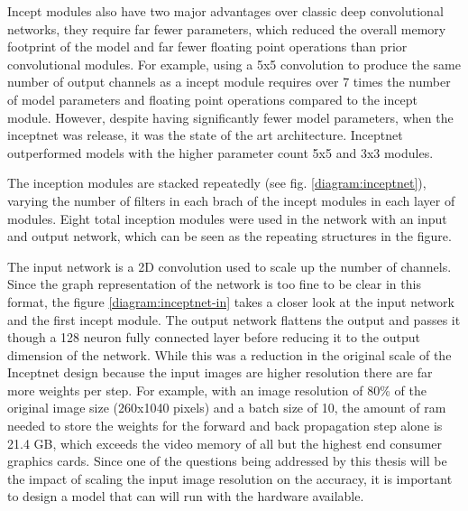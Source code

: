 Incept modules also have two major advantages over classic deep convolutional networks, they require far fewer parameters, which reduced the overall memory footprint of the model and far fewer floating point operations than prior convolutional modules. For example, using a 5x5 convolution to produce the same number of output channels as a incept module requires over 7 times the number of model parameters and floating point operations compared to the incept module. However, despite having significantly fewer model parameters, when the inceptnet was release, it was the state of the art architecture. Inceptnet outperformed models with the higher parameter count 5x5 and 3x3 modules.

The inception modules are stacked repeatedly (see fig. \ref{diagram:inceptnet}), varying the number of filters in each brach of the incept modules in each layer of modules. Eight total inception modules were used in the network with an input and output network, which can be seen as the repeating structures in the figure.

The input network is a 2D convolution used to scale up the number of channels. Since the graph representation of the network is too fine to be clear in this format, the figure \ref{diagram:inceptnet-in} takes a closer look at the input network and the first incept module. The output network flattens the output and passes it though a 128 neuron fully connected layer before reducing it to the output dimension of the network. While this was a reduction in the original scale of the Inceptnet design because the input images are higher resolution there are far more weights per step. For example, with an image resolution of 80\% of the original image size (260x1040 pixels) and a batch size of 10, the amount of ram needed to store the weights for the forward and back propagation step alone is 21.4 GB, which exceeds the video memory of all but the highest end consumer graphics cards. Since one of the questions being addressed by this thesis will be the impact of scaling the input image resolution on the accuracy, it is important to design a model that can will run with the hardware available.


